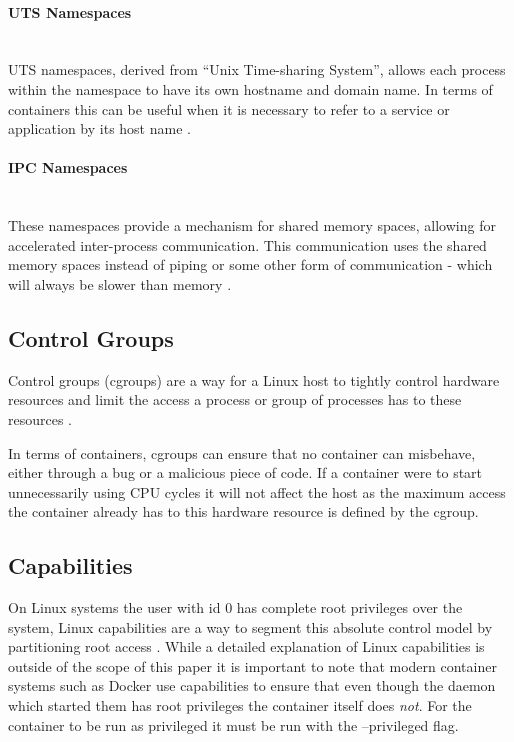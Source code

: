 \documentclass{article}
\begin{document}
\paragraph{UTS Namespaces}\mbox{}\\
UTS namespaces, derived from ``Unix Time-sharing System'', allows each process within the namespace to have its own hostname and domain name. In terms of containers this can be useful when it is necessary to refer to a service or application by its host name \citep{Kerrisk2013}.

\paragraph{IPC Namespaces}\mbox{}\\
These namespaces provide a mechanism for shared memory spaces, allowing for accelerated inter-process communication. This communication uses the shared memory spaces instead of piping or some other form of communication - which will always be slower than memory \citep{DockerDocs2016}.

\subsection{Control Groups}
\label{subs:CGroups}
Control groups (cgroups) are a way for a Linux host to tightly control hardware resources and limit the access a process or group of processes has to these resources \citep{Whitepaper2016}. 

In terms of containers, cgroups can ensure that no container can misbehave, either through a bug or a malicious piece of code. If a container were to start unnecessarily using CPU cycles it will not affect the host as the maximum access the container already has to this hardware resource is defined by the cgroup.

\subsection{Capabilities}
\label{subs:Capabilities}
On Linux systems the user with id 0 has complete root privileges over the system, Linux capabilities are a way to segment this absolute control model by partitioning root access \citep{Whitepaper2016}. While a detailed explanation of Linux capabilities is outside of the scope of this paper it is important to note that modern container systems such as Docker use capabilities to ensure that even though the daemon which started them has root privileges the container itself does \textit{not}. For the container to be run as privileged it must be run with the --privileged flag. 
\end{document}
